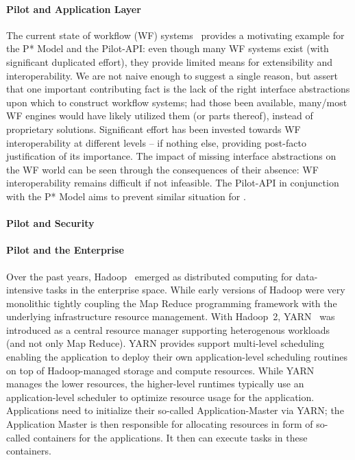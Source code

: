 \documentclass{sig-alternate}
\begin{document}
\paragraph*{Pilot and Application Layer} The current state of workflow
(WF) systems~\cite{nsf-workflow,1196459} provides a motivating example
for the P* Model and the Pilot-API: even though many WF systems exist
(with significant duplicated effort), they provide limited means for
extensibility and interoperability.  We are not naive enough to suggest
a single reason, but assert that one important contributing fact is the
lack of the right interface abstractions upon which to construct
workflow systems; had those been available, many/most WF engines would
have likely utilized them (or parts thereof), instead of proprietary
solutions. Significant effort has been invested towards WF
interoperability at different levels -- if nothing else, providing
post-facto justification of its importance. The impact of missing
interface abstractions on the WF world can be seen through the
consequences of their absence: WF interoperability remains difficult if
not infeasible. The Pilot-API in conjunction with the P* Model aims to
prevent similar situation for \pilotjobs.

\paragraph*{Pilot and Security} 

\paragraph*{Pilot and the Enterprise} Over the past years,
Hadoop~\cite{hadoop} emerged as distributed computing for data-intensive
tasks in the enterprise space. While early versions of Hadoop were very
monolithic tightly coupling the Map Reduce programming framework with
the underlying infrastructure resource management. With Hadoop~2,
YARN~\cite{yarn-paper} was introduced as a central resource manager
supporting heterogenous workloads (and not only Map Reduce). YARN
provides support multi-level scheduling enabling the application to
deploy their own application-level scheduling routines on top of
Hadoop-managed storage and compute resources. While YARN manages the
lower resources, the higher-level runtimes typically use an
application-level scheduler to optimize resource usage for the
application. Applications need to initialize their so-called
Application-Master via YARN; the Application Master is then responsible
for allocating resources in form of so-called containers for the
applications. It then can execute tasks in these containers.
\end{document}

